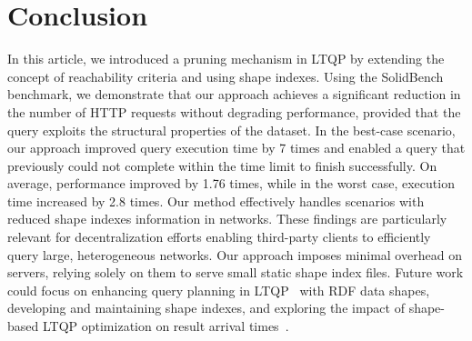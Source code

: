 \section{Conclusion}\label{sec:conclusion}

In this article, we introduced a pruning mechanism in LTQP by extending the concept of reachability criteria and using shape indexes.
Using the SolidBench benchmark, we demonstrate that our approach achieves a significant reduction in the number of HTTP requests without degrading performance, provided that the query exploits the structural properties of the dataset.
In the best-case scenario, our approach improved query execution time by 7 times and enabled a query that previously could not complete within the time limit to finish successfully.
On average, performance improved by 1.76 times, while in the worst case, execution time increased by 2.8 times.
Our method effectively handles scenarios with reduced shape indexes information in networks.
These findings are particularly relevant for decentralization efforts enabling third-party clients to efficiently query large, heterogeneous networks.
Our approach imposes minimal overhead on servers, relying solely on them to serve small static shape index files.
Future work could focus on enhancing query planning in LTQP~\cite{taelman2024towards} with RDF data shapes, developing and maintaining shape indexes, and exploring the impact of shape-based LTQP optimization on result arrival times~\cite{Acosta2017}.

